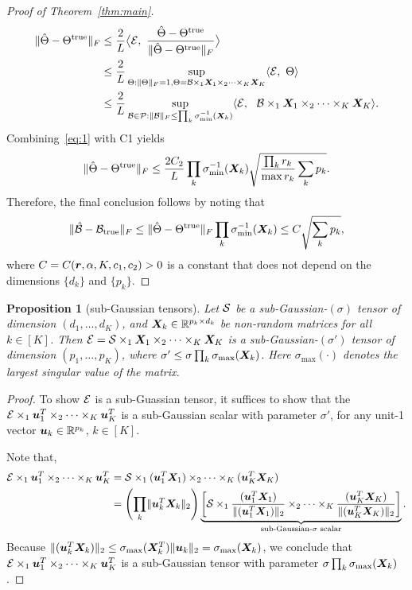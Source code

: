 \documentclass[12pt]{article}
\theoremstyle{plain}
\newtheorem{prop}{Proposition}
\theoremstyle{definition}
\newcommand*{\KeepStyleUnderBrace}[1]{%
  \mathop{%
    \mathchoice
    {\underbrace{\displaystyle#1}}%
    {\underbrace{\textstyle#1}}%
    {\underbrace{\scriptstyle#1}}%
    {\underbrace{\scriptscriptstyle#1}}%
  }\limits
}
\begin{document}
\begin{proof}[Proof of Theorem~\ref{thm:main}]
\begin{align}\label{eq:1}
\lVert\hat \Theta-\Theta^{\text{true}}\rVert_F&\leq {2\over L}\big\langle \mathcal{E},\ {\hat \Theta -\Theta^{\text{true}} \over \lVert\hat \Theta-\Theta^{\text{true}}\rVert_F} \big\rangle\notag \\
&\leq {2\over L}\sup_{\Theta: \lVert\Theta\rVert_F=1, \Theta=\mathcal{B}\times_1\bm X_1\times_2\cdots\times_K \bm X_K}\langle \mathcal{E},\ \Theta \rangle\notag \\
&\leq {2\over L}\sup_{\mathcal{B}\in\mathcal{P}: \lVert\mathcal{B}\rVert_F\leq \prod_k \sigma^{-1}_{\min}(\bm X_k)} \langle \mathcal{E},\ \ \mathcal{B}\times_1\bm X_1\times_2\cdots\times_K\bm X_K\rangle.
\end{align}
Combining~\eqref{eq:1} with C1 yields 
\[
\lVert\hat \Theta-\Theta^{\text{true}}\rVert_F \leq {2C_2\over L} \prod_k \sigma^{-1}_{\min}(\bm X_k)\sqrt{{\prod_k r_k \over \max r_k}\sum_k p_k}.
\]
Therefore, the final conclusion follows by noting that 
\[
\lVert\hat {\mathcal{B}}-\mathcal{B}_{\text{true}}\rVert_F\leq \lVert\hat \Theta-\Theta^{\text{true}}\rVert_F\prod_{k}\sigma^{-1}_{\min}(\bm X_k)\leq C\sqrt{\sum_k p_k},
\]
where $C=C(\bm{r}, \alpha,K,c_1, c_2)>0$ is a constant that does not depend on the dimensions $\{d_k\}$ and $\{p_k\}$. 
\end{proof}

\begin{prop}[sub-Gaussian tensors]\label{prop:sub}
Let $\mathcal{S}$ be a sub-Gaussian-$(\sigma)$ tensor of dimension $(d_1,\ldots,d_K)$, and $\bm X_k\in\mathbb{R}^{p_k\times d_k}$ be non-random matrices for all $k\in[K]$. Then $\mathcal{E}=\mathcal{S} \times_1  \bm X_1\times_2\cdots\times_K  \bm X_K$ is a sub-Gaussian-$(\sigma')$ tensor of dimension $(p_1,\ldots,p_K)$, where $\sigma'\leq \sigma \prod_k\sigma_{\max}(\bm X_k)$. Here $\sigma_{\max}(\cdot)$ denotes the largest singular value of the matrix. 
\end{prop}

\begin{proof}
To show $\mathcal{E}$ is a sub-Guassian tensor, it suffices to show that the $\mathcal{E}\times_1 \bm{u}^T_1\times_2\cdots\times_K \bm{u}^T_K$ is a sub-Gaussian scalar with parameter $\sigma'$, for any unit-1 vector $\bm{u}_k\in\mathbb{R}^{p_k}$, $k\in[K]$. 

Note that, 
\begin{align}
\tE\times_1 \bmu^T_1\times_2\cdots\times_K \bmu^T_K&=\tS\times_1 (\bmu^T_1\mX_1) \times_2\cdots\times_K (\bmu^T_K\mX_K)\\
&= \left(\prod_k \vnormSize{}{\bmu^T_k\mX_k}\right) \KeepStyleUnderBrace{\left[\tS\times_1 { (\bmu^T_1\mX_1)\over \vnormSize{}{(\bmu^T_1\mX_1)}}\times_2\cdots\times_K { (\bmu^T_K\mX_K)\over \vnormSize{}{(\bmu^T_K\mX_K)}}\right]}_{\text{sub-Gaussian-$\sigma$ scalar}}.
\end{align}
Because $\lVert(\bm{u}^T_k\bm X_k)\rVert_2\leq \sigma_{\max}(\bm X^T_k)\lVert\bm{u}_k\rVert_2=\sigma_{\max}(\bm X_k)$, we conclude that $\mathcal{E}\times_1 \bm{u}^T_1\times_2\cdots\times_K \bm{u}^T_K$ is a sub-Gaussian tensor with parameter $\sigma \prod_k \sigma_{\max}(\bm X_k)$. 
\end{proof}
\end{document}

